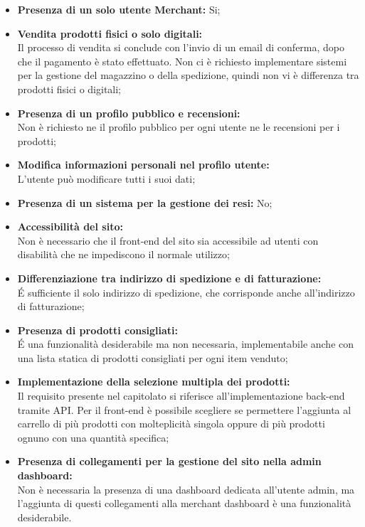\begin{itemize}
\item \textbf{Presenza di un solo utente Merchant:} Si;
\item \textbf{Vendita prodotti fisici o solo digitali:} \\
Il processo di vendita si conclude con l'invio di un email di conferma, dopo che il pagamento è stato effettuato. Non ci è richiesto implementare sistemi per la gestione del magazzino o della spedizione, quindi non vi è differenza tra prodotti fisici o digitali;
\item \textbf{Presenza di un profilo pubblico e recensioni:} \\
Non è richiesto ne il profilo pubblico per ogni utente ne le recensioni per i prodotti; 
\item \textbf{Modifica informazioni personali nel profilo utente:} \\
L'utente può modificare tutti i suoi dati;
\item \textbf{Presenza di un sistema per la gestione dei resi:} No;
\item \textbf{Accessibilità del sito:} \\
Non è necessario che il front-end del sito sia accessibile ad utenti con disabilità che ne impediscono il normale utilizzo;
\item \textbf{Differenziazione tra indirizzo di spedizione e di fatturazione:} \\
É sufficiente il solo indirizzo di spedizione, che corrisponde anche all'indirizzo di fatturazione;
\item \textbf{Presenza di prodotti consigliati:} \\
É una funzionalità desiderabile ma non necessaria, implementabile anche con una lista statica di prodotti consigliati per ogni item venduto;
\item \textbf{Implementazione della selezione multipla dei prodotti:} \\
Il requisito presente nel capitolato si riferisce all'implementazione back-end tramite API. Per il front-end è possibile scegliere se permettere l'aggiunta al carrello di più prodotti con molteplicità singola oppure di più prodotti ognuno con una quantità specifica;
\item \textbf{Presenza di collegamenti per la gestione del sito nella admin dashboard:} \\
Non è necessaria la presenza di una dashboard dedicata all'utente admin, ma l'aggiunta di questi collegamenti alla merchant dashboard è una funzionalità desiderabile.

\end{itemize}

